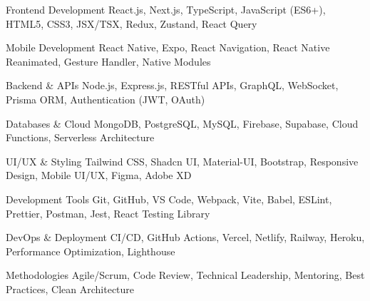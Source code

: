 

\begin{cvskills}

  \cvskill
    {Frontend Development}
    {React.js, Next.js, TypeScript, JavaScript (ES6+), HTML5, CSS3, JSX/TSX, Redux, Zustand, React Query}

  \cvskill
    {Mobile Development}
    {React Native, Expo, React Navigation, React Native Reanimated, Gesture Handler, Native Modules}

  \cvskill
    {Backend \& APIs}
    {Node.js, Express.js, RESTful APIs, GraphQL, WebSocket, Prisma ORM, Authentication (JWT, OAuth)}

  \cvskill
    {Databases \& Cloud}
    {MongoDB, PostgreSQL, MySQL, Firebase, Supabase, Cloud Functions, Serverless Architecture}

  \cvskill
    {UI/UX \& Styling}
    {Tailwind CSS, Shadcn UI, Material-UI, Bootstrap, Responsive Design, Mobile UI/UX, Figma, Adobe XD}

  \cvskill
    {Development Tools}
    {Git, GitHub, VS Code, Webpack, Vite, Babel, ESLint, Prettier, Postman, Jest, React Testing Library}

  \cvskill
    {DevOps \& Deployment}
    {CI/CD, GitHub Actions, Vercel, Netlify, Railway, Heroku, Performance Optimization, Lighthouse}

  \cvskill
    {Methodologies}
    {Agile/Scrum, Code Review, Technical Leadership, Mentoring, Best Practices, Clean Architecture}

\end{cvskills} 
